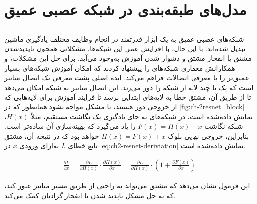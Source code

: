 \section{مدل‌های طبقه‌بندی در شبکه عصبی عمیق}

\subsection{}
\label{ResNet subsection}
شبکه‌های عصبی عمیق به یک ابزار قدرتمند در انجام وظایف مختلف یادگیری ماشین تبدیل شده‌اند. با این حال، با افزایش عمق این شبکه‌ها، مشکلاتی همچون ناپدیدشدن مشتق
یا انقجار مشتق 
 و دشوار شدن آموزش به‌وجود می‌آید. برای حل این مشکلات،
  \cite{he2016deep}
   و همکارانش معماری شبکه‌های 
   را پیشنهاد کردند که امکان آموزش شبکه‌های بسیار عمیق‌تر را با معرفی اتصالات 
   فراهم می‌کند.
ایده اصلی پشت 
 معرفی یک اتصال میانبر
 است که یک یا چند لایه از شبکه را دور می‌زند. این اتصال میانبر به شبکه امکان می‌دهد تا از طریق آن، مشتق خطا به لایه‌های ابتدایی برسد تا فرایند آموزش برای لایه‌هایی که از خروجی دور هستند، با مشکل مواجه نشود.همانطور که در 
 \autoref{fig:ch-2resnet_block}
 نمایش داده‌‌شده است، در شبکه‌های 
 به جای یادگیری یک نگاشت مستقیم، مثلاً $H(x)$، شبکه نگاشت $F(x) = H(x) - x$ را یاد می‌گیرد که بهینه‌سازی آن ساده‌تر است. بنابراین، خروجی نهایی بلوک
  $H(x) = F(x) + x$ خواهد بود که در نتیجه آن، مشتق
 تابع خطای $L$ به‌ازای ورودی $x$ در 
 \autoref{eq:ch2-resnet-deriviation}
 نمایش‌ داده‌شده است.
 
\begin{latin}
\begin{equation}
\label{eq:ch2-resnet-deriviation}
\begin{aligned}
 \frac{\partial L}{\partial x} = \frac{\partial L}{\partial H(x)} \cdot \frac{\partial H(x)}{\partial x} = \frac{\partial L}{\partial H(x)} \cdot \left(1 + \frac{\partial F(x)}{\partial x}\right)
\end{aligned}
\end{equation}
\end{latin}

 
 این فرمول نشان می‌دهد که مشتق می‌تواند به راحتی از طریق مسیر میانبر عبور کند، که به حل مشکل ناپدید شدن یا انفجار گرادیان کمک می‌کند.
 

